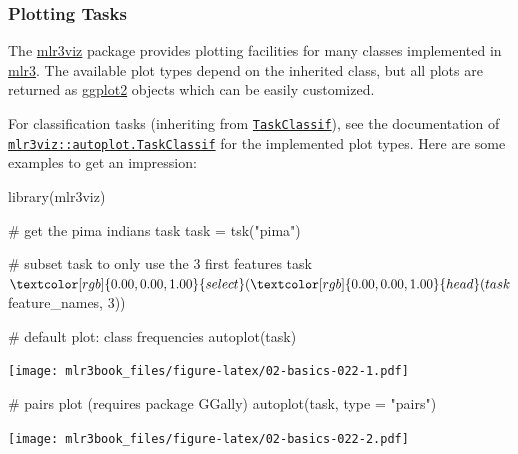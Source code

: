 \documentclass[]{article}
\newenvironment{Shaded}{}{}
\newcommand{\CommentTok}[1]{\textcolor[rgb]{0.00,0.50,0.00}{#1}}
\newcommand{\DataTypeTok}[1]{#1}
\newcommand{\DecValTok}[1]{#1}
\newcommand{\KeywordTok}[1]{\textcolor[rgb]{0.00,0.00,1.00}{#1}}
\newcommand{\NormalTok}[1]{#1}
\newcommand{\OperatorTok}[1]{#1}
\newcommand{\StringTok}[1]{\textcolor[rgb]{0.00,0.50,0.50}{#1}}
\renewenvironment{Shaded} {\begin{snugshade}\small} {\end{snugshade}}
\begin{document}
\hypertarget{autoplot-task}{%
\subsubsection{Plotting Tasks}\label{autoplot-task}}

The \href{https://mlr3viz.mlr-org.com}{mlr3viz} package provides plotting facilities for many classes implemented in \href{https://mlr3.mlr-org.com}{mlr3}.
The available plot types depend on the inherited class, but all plots are returned as \href{https://cran.r-project.org/package=ggplot2}{ggplot2} objects which can be easily customized.

For classification tasks (inheriting from \href{https://mlr3.mlr-org.com/reference/TaskClassif.html}{\texttt{TaskClassif}}), see the documentation of \href{https://mlr3viz.mlr-org.com/reference/autoplot.TaskClassif.html}{\texttt{mlr3viz::autoplot.TaskClassif}} for the implemented plot types.
Here are some examples to get an impression:

\begin{Shaded}
\begin{Highlighting}[]
\KeywordTok{library}\NormalTok{(mlr3viz)}

\CommentTok{# get the pima indians task}
\NormalTok{task =}\StringTok{ }\KeywordTok{tsk}\NormalTok{(}\StringTok{"pima"}\NormalTok{)}

\CommentTok{# subset task to only use the 3 first features}
\NormalTok{task}\OperatorTok{$}\KeywordTok{select}\NormalTok{(}\KeywordTok{head}\NormalTok{(task}\OperatorTok{$}\NormalTok{feature_names, }\DecValTok{3}\NormalTok{))}

\CommentTok{# default plot: class frequencies}
\KeywordTok{autoplot}\NormalTok{(task)}
\end{Highlighting}
\end{Shaded}

\texttt{[image: mlr3book\_files/figure-latex/02-basics-022-1.pdf]}

\begin{Shaded}
\begin{Highlighting}[]

\CommentTok{# pairs plot (requires package GGally)}
\KeywordTok{autoplot}\NormalTok{(task, }\DataTypeTok{type =} \StringTok{"pairs"}\NormalTok{)}
\end{Highlighting}
\end{Shaded}

\texttt{[image: mlr3book\_files/figure-latex/02-basics-022-2.pdf]}
\end{document}
